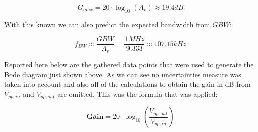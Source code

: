 \documentclass[../main.tex]{subfiles}
\begin{document}
\begin{equation}
	G_{max} = 20 \cdot \log_{10} \left ( A_v \right ) \approx 19.4 \unit{dB}
\end{equation}

With this known we can also predict the expected bandwidth from $GBW$:

\begin{equation}
	f_{BW} \approx \frac{GBW}{A_v} = \frac{1 \unit{MHz}}{9.333} \approx 107.15 \unit{kHz}
\end{equation}





Reported here below are the gathered data points that were used to generate the Bode diagram just shown above. As we can see no uncertainties measure was taken into account and also all of the calculations to obtain the gain in dB from $V_{pp,in}$ and $V_{pp,out}$ are omitted. This was the formula that was applied:

\begin{equation}
	\unit{\textbf{Gain}} = 20 \cdot \log_{10} \left( \frac{V_{pp,out}}{V_{pp,in}} \right)
\end{equation}
\end{document}
